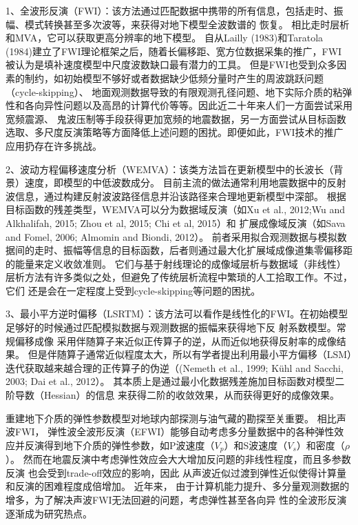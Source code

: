 
1、全波形反演（FWI）：该方法通过匹配数据中携带的所有信息，包括走时、振幅、模式转换甚至多次波等，来获得对地下模型全波数谱的
恢复。
相比走时层析和MVA，它可以获取更高分辨率的地下模型。
自从Lailly (1983)\cite{lailly1983seismic}和Taratola
(1984)\cite{tarantola1984}建立了FWI理论框架之后，随着长偏移距、宽方位数据采集的推广，FWI
被认为是填补速度模型中尺度波数缺口最有潜力的工具。
但是FWI也受到众多因素的制约，如初始模型不够好或者数据缺少低频分量时产生的周波跳跃问题（cycle-skipping）、
地面观测数据导致的有限观测孔径问题、地下实际介质的粘弹性和各向异性问题以及高昂的计算代价等等。因此近二十年来人们一方面尝试采用宽频震源、
鬼波压制等手段获得更加宽频的地震数据，另一方面尝试从目标函数选取、多尺度反演策略等方面降低上述问题的困扰。即便如此，FWI技术的推广应用扔存在许多挑战。

2、波动方程偏移速度分析（WEMVA）：该类方法旨在更新模型中的长波长（背景）速度，即模型的中低波数成分。
目前主流的做法通常利用地震数据中的反射波信息，通过构建反射波波路径信息并沿该路径来合理地更新模型中深部。
根据目标函数的残差类型，WEMVA可以分为数据域反演（如Xu et al., 2012\cite{xu:2012};Wu and Alkhalifah,
2015\cite[]{Wu2015b}; Zhou et al,
2015\cite[]{zhou:2015}; Chi et al, 2015\cite{chi2015}）和
扩展成像域反演（如Sava and Fomel, 2006\cite{Sava2006}; Almomin and Biondi, 2012\cite{Almomin2012}）。
前者采用拟合观测数据与模拟数据间的走时、振幅等信息的目标函数，后者则通过最大化扩展域成像道集零偏移距的能量来定义收敛准则。
它们与基于射线理论的成像域层析与数据域（非线性）层析方法有许多类似之处，但避免了传统层析流程中繁琐的人工拾取工作。不过，它们
还是会在一定程度上受到cycle-skipping等问题的困扰。

3、最小平方逆时偏移（LSRTM）：该方法可以看作是线性化的FWI。在初始模型足够好的时候通过匹配模拟数据与观测数据的振幅来获得地下反
射系数模型。常规偏移成像
采用伴随算子来近似正传算子的逆，从而近似地获得反射率的成像结果。
但是伴随算子通常近似程度太大，所以有学者提出利用最小平方偏移（LSM）迭代获取越来越合理的正传算子的伪逆（(Nemeth
et al., 1999\cite{Nemeth1999}; Kühl and Sacchi, 2003\cite{KuehlEtAl2003};
Dai et al.,
2012\cite{DaiEtAl2012}）。
其本质上是通过最小化数据残差施加目标函数对模型二阶导数（Hessian）的信息
来获得二阶的收敛效果，从而获得更好的成像效果。

重建地下介质的弹性参数模型对地球内部探测与油气藏的勘探至关重要。
相比声波FWI，
弹性波全波形反演（EFWI）能够自动考虑多分量数据中的各种弹性效应并反演得到地下介质的弹性参数，如P波速度（$V_p$）和S波速度（$V_s$）和密度（$\rho$）。
然而在地震反演中考虑弹性效应会大大增加反问题的非线性程度，而且多参数反演
也会受到trade-off效应的影响，因此
从声波近似过渡到弹性近似使得计算量和反演的困难程度成倍增加。
近年来，
由于计算机能力提升、多分量观测数据的增多，为了解决声波FWI无法回避的问题，考虑弹性甚至各向异
性的全波形反演逐渐成为研究热点。

